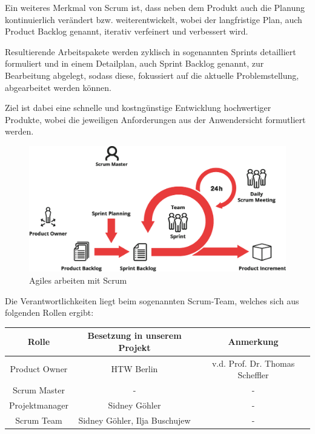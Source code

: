 Ein weiteres Merkmal von Scrum ist, dass neben dem Produkt auch die Planung kontinuierlich verändert bzw. weiterentwickelt, wobei der langfristige Plan, auch Product Backlog genannt, iterativ verfeinert und verbessert wird.

Resultierende Arbeitspakete werden zyklisch in sogenannten Sprints detailliert formuliert und in einem Detailplan, auch Sprint Backlog genannt, zur Bearbeitung abgelegt, sodass diese, fokussiert auf die aktuelle Problemstellung, abgearbeitet werden können.

Ziel ist dabei eine schnelle und kostngünstige Entwicklung hochwertiger Produkte, wobei die jeweiligen Anforderungen aus der Anwendersicht formutliert werden.

\begin{figure}[h]
	 \centering
	 \includegraphics[width=1\textwidth]{pictures/scrum}
	 \caption[Agiles arbeiten mit Scrum]{Agiles arbeiten mit Scrum\cite{scrum2018}}
	 \label{fig:scrum}
\end{figure}

\newpage

Die Verantwortlichkeiten liegt beim sogenannten Scrum-Team, welches sich aus folgenden Rollen ergibt:
\begin{adjustwidth}{-1in}{-1in}%
	\begin{center}
		\begin{tabular}{ ccc }
			\toprule
			{Rolle} & {Besetzung in unserem Projekt} & {Anmerkung}\\

			\midrule
			{Product Owner} & {HTW Berlin} & {v.d. Prof. Dr. Thomas Scheffler}\\
			{Scrum Master} & {-} & {-}\\
			{Projektmanager} & {Sidney Göhler} & {-}\\
			{Scrum Team} & {Sidney Göhler, Ilja Buschujew} & {-}\\
			\bottomrule
		\end{tabular}
		 \label{tab:scrumverantwortung} 
    \end{center}
\end{adjustwidth}


